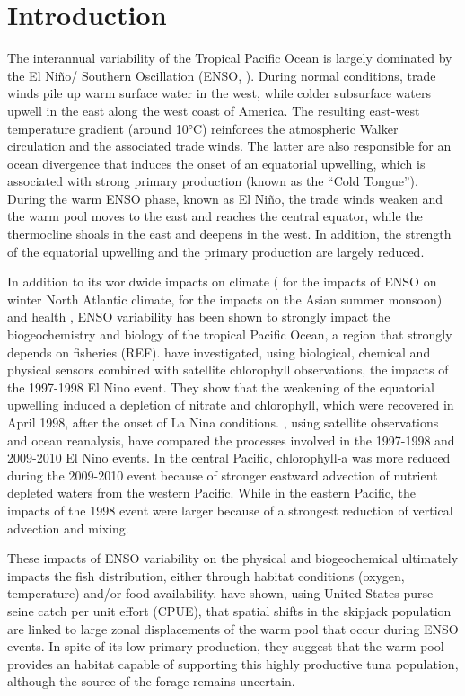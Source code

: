 \section{Introduction}

The interannual variability of the Tropical Pacific Ocean is largely dominated by the El Niño/ Southern Oscillation (ENSO, \citealt{trenberthNinoSouthernOscillation2019}). During normal conditions, trade winds pile up warm surface water in the west, while colder subsurface waters upwell in the east along the west coast of America. The resulting east-west temperature gradient (around 10°C) reinforces the atmospheric Walker circulation and the associated trade winds. The latter are also responsible for an ocean divergence that induces the onset of an equatorial upwelling, which is associated with strong primary production (known as the “Cold Tongue”). During the warm ENSO phase, known as El Niño, the trade winds weaken and the warm pool moves to the east and reaches the central equator, while the thermocline shoals in the east and deepens in the west. In addition, the strength of the equatorial upwelling and the primary production are largely reduced.

In addition to its worldwide impacts on climate (\citealt{toniazzoInfluenceENSOWinter2006} for the impacts of ENSO on winter North Atlantic climate, \citealt{juAsianSummerMonsoon1995} for the impacts on the Asian summer monsoon) and health \cite{kovatsNinoHealth2003}, ENSO variability has been shown to strongly impact the biogeochemistry and biology of the tropical Pacific Ocean, a region that strongly depends on fisheries (REF). \cite{chavezBiologicalChemicalResponse1999} have investigated, using biological, chemical and physical sensors combined with satellite chlorophyll observations, the impacts of the 1997-1998 El Nino event. They show that the weakening of the equatorial upwelling induced a depletion of nitrate and chlorophyll, which were recovered in April 1998, after the onset of La Nina conditions. \cite{gierachBiologicalResponse19972012}, using satellite observations and ocean reanalysis, have compared the processes involved in the 1997-1998 and 2009-2010 El Nino events. In the central Pacific, chlorophyll-a was more reduced during the 2009-2010 event because of stronger eastward advection of nutrient depleted waters from the western Pacific. While in the eastern Pacific, the impacts of the 1998 event were larger because of a strongest reduction of vertical advection and mixing.

These impacts of ENSO variability on the physical and biogeochemical ultimately impacts the fish distribution, either through habitat conditions (oxygen, temperature) and/or food availability. \cite{lehodeyNinoSouthernOscillation1997}  have shown, using United States purse seine catch per unit effort (CPUE), that spatial shifts in the skipjack population are linked to large zonal displacements of the warm pool that occur during ENSO  events. In spite of its low primary production, they suggest that the warm pool provides an habitat capable of supporting this highly productive tuna population, although the source of the forage remains uncertain.


